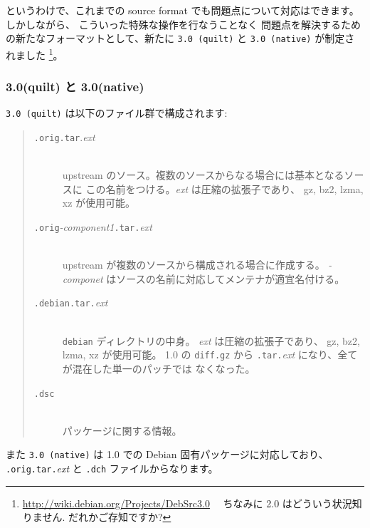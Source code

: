 \documentclass[mingoth,a4paper]{jsarticle}
\begin{document}
というわけで、これまでの source format でも問題点について対応はできます。
しかしながら、
こういった特殊な操作を行なうことなく
問題点を解決するための新たなフォーマットとして、新たに
{\tt 3.0 (quilt)} と {\tt 3.0 (native)} が制定されました%
\footnote{%
  \url{http://wiki.debian.org/Projects/DebSrc3.0}　
  ちなみに 2.0 はどういう状況知りません. だれかご存知ですか?
}。

\subsubsection{3.0(quilt) と 3.0(native)}

{\tt 3.0 (quilt)} は以下のファイル群で構成されます:
\begin{quote}
    \begin{screen}
        \begin{description}
              \item[{\tt .orig.tar}.{\it ext}] 　\\
            upstream のソース。複数のソースからなる場合には基本となるソースに
            この名前をつける。{\it ext} は圧縮の拡張子であり、
            gz, bz2, lzma, xz が使用可能。
              \item[{\tt .orig}{\it -component1}{\tt .tar.}{\it ext}]　\\
            upstream が複数のソースから構成される場合に作成する。
            {\it -componet} はソースの名前に対応してメンテナが適宜名付ける。
              \item[{\tt .debian.tar.}{\it ext}]　\\
            {\tt debian} ディレクトリの中身。
            {\it ext} は圧縮の拡張子であり、
            gz, bz2, lzma, xz が使用可能。
            1.0 の {\tt diff.gz} から
            {\tt .tar.}{\it ext} になり、全てが混在した単一のパッチでは
            なくなった。
              \item[{\tt .dsc}] 　\\
          パッケージに関する情報。
        \end{description}
    \end{screen}
\end{quote}
また {\tt 3.0 (native)} は 1.0 での Debian 固有パッケージに対応しており、
{\tt .orig.tar.}{\it ext} と {\tt .dch} ファイルからなります。
\end{document}
